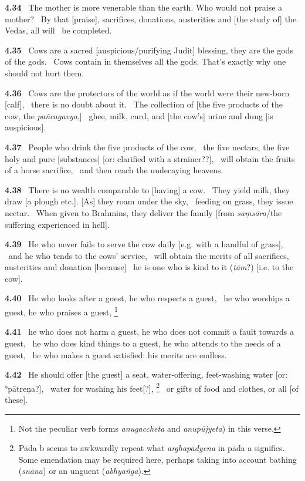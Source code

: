 \documentclass{article}
\newcommand{\skt}[1]{\textit{#1}}
\begin{document}
\textbf{4.34}%
\ The mother is more venerable than the earth. Who would not praise a mother?%
\ By that [praise], sacrifices, donations, austerities and [the study of] the Vedas, all will%
\                         be completed.%


\textbf{4.35}%
\ Cows are a sacred [auspicious/purifying Judit] blessing, they are the gods of the gods.%
\ Cows contain in themselves all the gods. That's exactly why one should not hurt them.%


\textbf{4.36}%
\ Cows are the protectors of the world as if the world were their new-born [calf],%
\                                         there is no doubt about it.%
\ The collection of [the five products of the cow, the \skt{pañcagavya},]%
\                         ghee, milk, curd, and [the cow's] urine and dung [is auspicious].%


\textbf{4.37}%
\ People who drink the five products of the cow,%
\                  the five nectars, the five holy and pure [substances] [or: clarified with a strainer??],%
\ will obtain the fruits of a horse sacrifice,%
\ and then reach the undecaying heavens.%


\textbf{4.38}%
\ There is no wealth comparable to [having] a cow.%
\ They yield milk, they draw [a plough etc.]. [As] they roam under the sky,%
\ feeding on grass, they issue nectar.%
\ When given to Brahmins, they deliver the family [from \skt{saṃsāra}/the suffering experienced in hell].%


\textbf{4.39}%
\ He who never fails to serve the cow daily [e.g. with a handful of grass],%
\ and he who tends to the cows' service,%
\ will obtain the merits of all sacrifices, austerities and donation [because]%
\                         he is one who is kind to it (\skt{tām}?) [i.e. to the cow].%


\textbf{4.40}%
\ He who looks after a guest, he who respects a guest,%
\ he who worships a guest, he who praises a guest,%
\footnote{Not the peculiar verb forms \skt{anugaccheta} and \skt{anupūjyeta}) in this verse. }%


\textbf{4.41}%
\ he who does not harm a guest, he who does not commit a fault towards a guest,%
\ he who does kind things to a guest, he who attends to the needs of a guest,%
\ he who makes a guest satisfied: his merits are endless.%


\textbf{4.42}%
\ He should offer [the guest] a seat, water-offering, feet-washing water [or: °pātreṇa?],%
\                 water for washing his feet[?],%
\footnote{Pāda b seems to awkwardly repeat what \skt{arghapādyena} in pāda a signifies.                Some emendation may be required here, perhaps taking into account bathing (\skt{snāna}) or                         an unguent (\skt{abhyaṅga}). }%
\ or gifts of food and clothes, or all [of these].%
\end{document}
